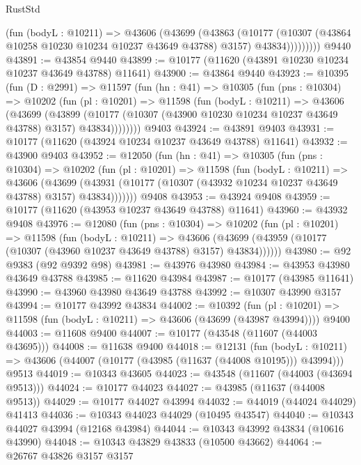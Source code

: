 \begin{lexlean}{RustStd}
\begin{coremodule}
              (fun (bodyL : @10211) =>
              @43606
                (@43699
                  (@43863
                    (@10177
                      (@10307 (@43864 @10258 @10230 @10234 @10237 @43649 @43788) @3157)
                      @43834)))))))))
    @9440
@43891 := @43854 @9440
@43899 := @10177 (@11620 (@43891 @10230 @10234 @10237 @43649 @43788) @11641)
@43900 := @43864 @9440
@43923 := @10395
    (fun (D : @2991) =>
    @11597
      (fun (hn : @41) =>
      @10305
        (fun (pns : @10304) =>
        @10202
          (fun (pl : @10201) =>
          @11598
            (fun (bodyL : @10211) =>
            @43606
              (@43699
                (@43899
                  (@10177 (@10307 (@43900 @10230 @10234 @10237 @43649 @43788) @3157) @43834))))))))
    @9403
@43924 := @43891 @9403
@43931 := @10177 (@11620 (@43924 @10234 @10237 @43649 @43788) @11641)
@43932 := @43900 @9403
@43952 := @12050
    (fun (hn : @41) =>
    @10305
      (fun (pns : @10304) =>
      @10202
        (fun (pl : @10201) =>
        @11598
          (fun (bodyL : @10211) =>
          @43606
            (@43699
              (@43931 (@10177 (@10307 (@43932 @10234 @10237 @43649 @43788) @3157) @43834)))))))
    @9408
@43953 := @43924 @9408
@43959 := @10177 (@11620 (@43953 @10237 @43649 @43788) @11641)
@43960 := @43932 @9408
@43976 := @12080
    (fun (pns : @10304) =>
    @10202
      (fun (pl : @10201) =>
      @11598
        (fun (bodyL : @10211) =>
        @43606 (@43699 (@43959 (@10177 (@10307 (@43960 @10237 @43649 @43788) @3157) @43834))))))
@43980 := @92 @9383 (@92 @9392 @98)
@43981 := @43976 @43980
@43984 := @43953 @43980 @43649 @43788
@43985 := @11620 @43984
@43987 := @10177 (@43985 @11641)
@43990 := @43960 @43980 @43649 @43788
@43992 := @10307 @43990 @3157
@43994 := @10177 @43992 @43834
@44002 := @10392
    (fun (pl : @10201) => @11598 (fun (bodyL : @10211) => @43606 (@43699 (@43987 @43994))))
    @9400
@44003 := @11608 @9400
@44007 := @10177 (@43548 (@11607 (@44003 @43695)))
@44008 := @11638 @9400
@44018 := @12131
    (fun (bodyL : @10211) => @43606 (@44007 (@10177 (@43985 (@11637 (@44008 @10195))) @43994)))
    @9513
@44019 := @10343 @43605
@44023 := @43548 (@11607 (@44003 (@43694 @9513)))
@44024 := @10177 @44023
@44027 := @43985 (@11637 (@44008 @9513))
@44029 := @10177 @44027 @43994
@44032 := @44019 (@44024 @44029) @41413
@44036 := @10343 @44023 @44029 (@10495 @43547)
@44040 := @10343 @44027 @43994 (@12168 @43984)
@44044 := @10343 @43992 @43834 (@10616 @43990)
@44048 := @10343 @43829 @43833 (@10500 @43662)
@44064 := @26767
    @43826
    @3157
    @3157

\end{coremodule}
\end{lexlean}
